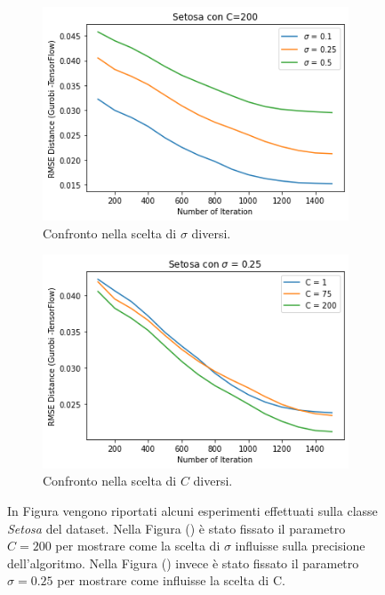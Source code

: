 \documentclass[a4paper,12pt]{report}
\begin{document}
\begin{figure}[H]
    \begin{subfigure}{0.47\textwidth}
        \centering
        \includegraphics[scale=0.5]{images/Grafici/Setosa_C200_sigmaDiversi.png}
        \caption{Confronto nella scelta di $\sigma$ diversi.}
        \label{subfig:Setosa_C200_sigmaDiversi}
    \end{subfigure}
    \begin{subfigure}{0.47\textwidth}
        \centering
        \includegraphics[scale=0.5]{images/Grafici/Setosa_Cdiversi_sigma025.png}
        \caption{Confronto nella scelta di $C$ diversi.}
        \label{subfig:Setosa_Cdiversi_sigma025}
    \end{subfigure}
    \caption{In Figura vengono riportati alcuni esperimenti effettuati sulla classe \textit{Setosa} del dataset. Nella Figura () è stato fissato il parametro $C=200$ per mostrare come la scelta di $\sigma$ influisse sulla precisione dell'algoritmo. Nella Figura () invece è stato fissato il parametro $\sigma = 0.25$ per mostrare come influisse la scelta di C.}
    \label{fig:Setosa_Preliminari}
\end{figure}
\end{document}
